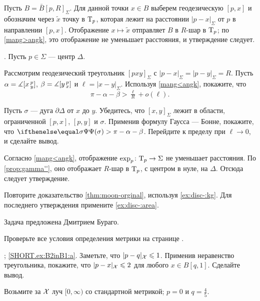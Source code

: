 \begin{multicols}{2}
Пусть $B=\bar B[p,R]_\Sigma$.
Для данной точки $x\in B$ выберем геодезическую $[p,x]$ и обозначим через $\tilde x$ точку в $\mathrm{T}_p$, которая лежит на расстоянии $|p-x|_\Sigma$ от $p$ в направлении $[p,x]$.
Отображение $x\mapsto \tilde x$ отправляет $B$ в $R$-шар в $\mathrm{T}_p$;
по \mbox{\ref{mang>angk}}, это отображение не уменьшает расстояния,
и утверждение следует.

\parbf{\ref{ex:disc-}}.
Пусть $p\in\Sigma$ --- центр $\Delta$. 

Рассмотрим геодезический треугольник $[pxy]_\Sigma$ с $|p-x|_\Sigma=|p-y|_\Sigma=R$.
Пусть $\alpha=\measuredangle[x\,{}^{p}_{y}]$, 
$\beta=\measuredangle[y\,{}^{p}_{x}]$ и $\ell=|x-y|_\Sigma$.
Используя \mbox{\ref{mang<angk}}, покажите, что 
\[\pi-\alpha-\beta>\tfrac\ell R+o(\ell).\]

Пусть $\sigma$ --- дуга $\partial \Delta$ от $x$ до $y$.
Убедитесь, что $[x,y]_\Sigma$ лежит в области, ограниченной $[p,x]$, $[p,y]$ и $\sigma$.
Применив формулу Гаусса --- Бонне, покажите, что $\tgc\sigma\z>\pi-\alpha-\beta$.
Перейдите к пределу при $\ell\to0$, и сделайте вывод.

Согласно \ref{mang<angk}, отображение $\exp_p\:\T_p\z\to\Sigma$ не уменьшает расстояния.
По \ref{prop:gamma''},  оно отображает $R$-шар в $\mathrm{T}_p$, с центром в нуле, на $\Delta$.
Отсюда следует утверждение.

Повторите доказательство \ref{thm:moon-orginal}, используя \ref{ex:disc-:kg}.
Для последнего утверждения примените \ref{ex:disc-:area}.

Задача предложена Дмитрием Бураго.


\setcounter{eqtn}{0}

Проверьте все условия определения метрики на странице \pageref{page:def:metric}.

\parbf{\ref{ex:B2inB1}}; \ref{SHORT.ex:B2inB1:a}.
Заметьте, что $\dist{p}{q}{\spc{X}}\le 1$.
Применив неравенство треугольника, покажите, что $\dist{p}{x}{\spc{X}}\le 2$ для любого $x\in B[q,1]$.
Сделайте вывод.

Возьмите за $\mathcal{X}$ луч $[0,\infty)$ со стандартной метрикой; $p=0$ и $q=\tfrac45$.


\end{multicols}
